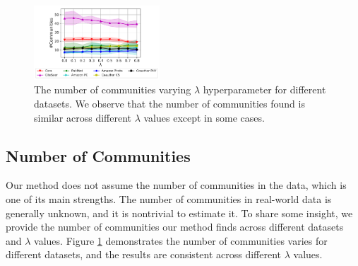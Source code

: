 \begin{figure}[ht]
    \centering
    \includegraphics[width=0.42\textwidth]{figures/results_number_clusters.pdf}
    \caption{The number of communities varying $\lambda$ hyperparameter for different datasets. We observe that the number of communities found is similar across different $\lambda$ values except in some cases.}
    \label{fig:lambda_effect_on_number_of_communities}
\end{figure}

\subsection{Number of Communities}

Our method does not assume the number of communities in the data, which is one of its main strengths. The number of communities in real-world data is generally unknown, and it is nontrivial to estimate it. To share some insight, we provide the number of communities our method finds across different datasets and $\lambda$ values. Figure \ref{fig:lambda_effect_on_number_of_communities} demonstrates the number of communities varies for different datasets, and the results are consistent across different $\lambda$ values.















